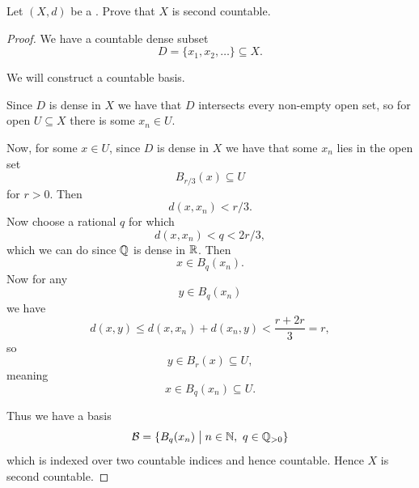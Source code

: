 \documentclass[11pt]{article}
\begin{document}
\begin{prob}
    Let $(X,d)$ be a . 
    Prove that $X$ is second countable. 
\end{prob}
\begin{proof}
    We have a countable dense subset 
    \[
        D = \{x_1,x_2,\ldots\} \subseteq X. 
    \]

    We will construct a countable basis. 

    Since $D$ is dense in $X$ we have that 
    $D$ intersects every non-empty open set, 
    so for open $U \subseteq X$ there is 
    some $x_n \in U$. 
    
    Now, for some $x \in U$, since $D$ is dense 
    in $X$ we have that some $x_n$ lies in the 
    open set 
    \[
        B_{r/3}(x) \subseteq U 
    \]
    for $r > 0$. Then 
    \[
        d(x,x_n) < r/3. 
    \]
    Now choose a rational $q$ for which 
    \[
        d(x,x_n) < q < 2r/3, 
    \]
    which we can do since $\mathbb{Q}$ is dense in 
    $\mathbb{R}$. Then 
    \[
        x \in B_q(x_n).  
    \]
    Now for any 
    \[
        y \in B_q(x_n) 
    \]
    we have 
    \[
        d(x,y) \leq d(x,x_n) + d(x_n, y) < \frac{r+2r}{3} 
        = r, 
    \]
    so 
    \[
        y \in B_r(x) \subseteq U, 
    \]
    meaning 
    \[
        x \in B_q(x_n) \subseteq U. 
    \]

    Thus we have a basis 
    \[
        \mathcal B = \{B_q(x_n) \bigm| n \in \mathbb N, 
        \ q \in \mathbb Q_{>0}\}
    \]
    which is indexed over two countable indices and hence 
    countable.
    Hence $X$ is second countable.  
\end{proof}
\end{document}
